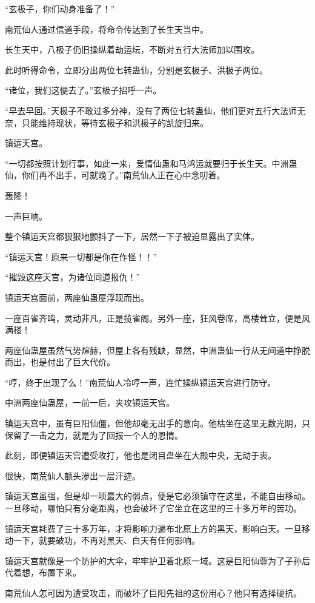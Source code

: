 \begin{this_body}
“玄极子，你们动身准备了！”

南荒仙人通过信道手段，将命令传达到了长生天当中。

长生天中，八极子仍旧操纵着劫运坛，不断对五行大法师加以围攻。

此时听得命令，立即分出两位七转蛊仙，分别是玄极子、洪极子两位。

“诸位，我们这便去了。”玄极子招呼一声。

“早去早回。”天极子不敢过多分神，没有了两位七转蛊仙，他们更对五行大法师无奈，只能维持现状，等待玄极子和洪极子的凯旋归来。

镇运天宫。

“一切都按照计划行事，如此一来，爱情仙蛊和马鸿运就要归于长生天。中洲蛊仙，你们再不出手，可就晚了。”南荒仙人正在心中念叨着。

轰隆！

一声巨响。

整个镇运天宫都狠狠地颤抖了一下，居然一下子被迫显露出了实体。

“镇运天宫！原来一切都是你在作怪！！”

“摧毁这座天宫，为诸位同道报仇！”

镇运天宫面前，两座仙蛊屋浮现而出。

一座百雀齐鸣，灵动非凡，正是揽雀阁。另外一座，狂风卷席，高楼耸立，便是风满楼！

两座仙蛊屋虽然气势煊赫，但屋上各有残缺，显然，中洲蛊仙一行从无间道中挣脱而出，也是付出了巨大代价。

“哼，终于出现了么！”南荒仙人冷哼一声，连忙操纵镇运天宫进行防守。

中洲两座仙蛊屋，一前一后，夹攻镇运天宫。

镇运天宫中，虽有巨阳仙僵，但他却毫无出手的意向。他枯坐在这里无数光阴，只保留了一击之力，就是为了回报一个人的恩情。

此刻，即便镇运天宫遭受攻打，他也是闭目盘坐在大殿中央，无动于衷。

很快，南荒仙人额头渗出一层汗迹。

镇运天宫虽强，但是却一项最大的弱点，便是它必须镇守在这里，不能自由移动。一旦移动，哪怕只有分毫距离，也会破坏了它坐立在这里的三十多万年的苦功。

镇运天宫耗费了三十多万年，才将影响力遍布北原上方的黑天，影响白天。一旦移动一下，就要破功，不再对黑天、白天有任何影响。

镇运天宫就像是一个防护的大伞，牢牢护卫着北原一域。这是巨阳仙尊为了子孙后代着想，布置下来。

南荒仙人怎可因为遭受攻击，而破坏了巨阳先祖的这份用心？他只有选择硬抗。


\end{this_body}
